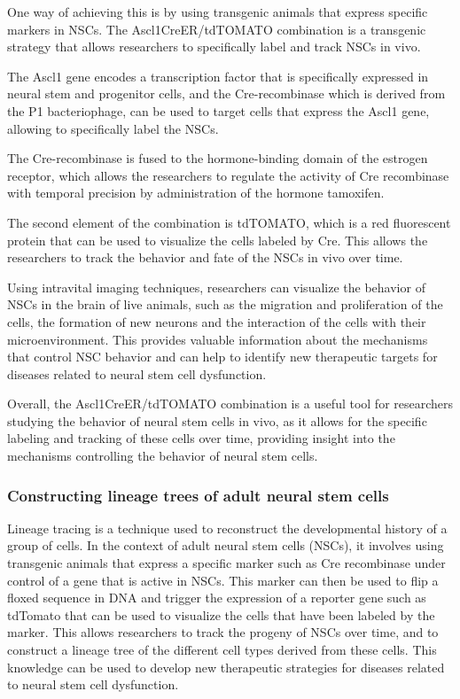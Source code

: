 \begin{itemize}
\begin{itemize}
One way of achieving this is by using transgenic animals that express specific markers in NSCs. The Ascl1CreER/tdTOMATO combination is a transgenic strategy that allows researchers to specifically label and track NSCs in vivo.

The Ascl1 gene encodes a transcription factor that is specifically expressed in neural stem and progenitor cells, and the Cre-recombinase which is derived from the P1 bacteriophage, can be used to target cells that express the Ascl1 gene, allowing to specifically label the NSCs.

The Cre-recombinase is fused to the hormone-binding domain of the estrogen receptor, which allows the researchers to regulate the activity of Cre recombinase with temporal precision by administration of the hormone tamoxifen.

The second element of the combination is tdTOMATO, which is a red fluorescent protein that can be used to visualize the cells labeled by Cre. This allows the researchers to track the behavior and fate of the NSCs in vivo over time.

Using intravital imaging techniques, researchers can visualize the behavior of NSCs in the brain of live animals, such as the migration and proliferation of the cells, the formation of new neurons and the interaction of the cells with their microenvironment. This provides valuable information about the mechanisms that control NSC behavior and can help to identify new therapeutic targets for diseases related to neural stem cell dysfunction.

Overall, the Ascl1CreER/tdTOMATO combination is a useful tool for researchers studying the behavior of neural stem cells in vivo, as it allows for the specific labeling and tracking of these cells over time, providing insight into the mechanisms controlling the behavior of neural stem cells.

\subsubsection{Constructing lineage trees of adult neural stem cells}
Lineage tracing is a technique used to reconstruct the developmental history of a group of cells. In the context of adult neural stem cells (NSCs), it involves using transgenic animals that express a specific marker such as Cre recombinase under control of a gene that is active in NSCs. This marker can then be used to flip a floxed sequence in DNA and trigger the expression of a reporter gene such as tdTomato that can be used to visualize the cells that have been labeled by the marker. This allows researchers to track the progeny of NSCs over time, and to construct a lineage tree of the different cell types derived from these cells. This knowledge can be used to develop new therapeutic strategies for diseases related to neural stem cell dysfunction.

\end{itemize}
\end{itemize}
